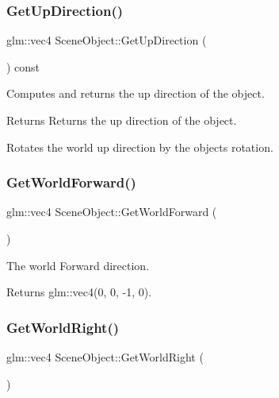 \subsubsection{\texorpdfstring{Get\+Up\+Direction()}{GetUpDirection()}}
{\footnotesize\ttfamily glm\+::vec4 Scene\+Object\+::\+Get\+Up\+Direction (\begin{DoxyParamCaption}{ }\end{DoxyParamCaption}) const\hspace{0.3cm}{\ttfamily [virtual]}}



Computes and returns the up direction of the object. 

\begin{DoxyReturn}{Returns}
Returns the up direction of the object.
\end{DoxyReturn}
Rotates the world up direction by the object\textquotesingle{}s rotation. \hypertarget{class_scene_object_a6fa71efda895933be4ee684745980e68}{}\label{class_scene_object_a6fa71efda895933be4ee684745980e68} 
\subsubsection{\texorpdfstring{Get\+World\+Forward()}{GetWorldForward()}}
{\footnotesize\ttfamily glm\+::vec4 Scene\+Object\+::\+Get\+World\+Forward (\begin{DoxyParamCaption}{ }\end{DoxyParamCaption})\hspace{0.3cm}{\ttfamily [static]}}



The world \textquotesingle{}Forward\textquotesingle{} direction. 

\begin{DoxyReturn}{Returns}
glm\+::vec4(0, 0, -\/1, 0). 
\end{DoxyReturn}
\hypertarget{class_scene_object_a46d0ffed082f7bd515b9550ef9f9a86a}{}\label{class_scene_object_a46d0ffed082f7bd515b9550ef9f9a86a} 
\subsubsection{\texorpdfstring{Get\+World\+Right()}{GetWorldRight()}}
{\footnotesize\ttfamily glm\+::vec4 Scene\+Object\+::\+Get\+World\+Right (\begin{DoxyParamCaption}{ }\end{DoxyParamCaption})\hspace{0.3cm}{\ttfamily [static]}}



